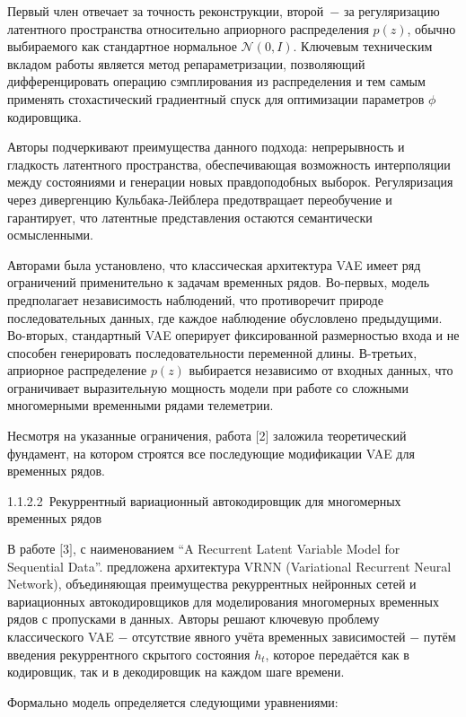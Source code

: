 \documentclass[14pt, a4paper, oneside]{extreport}
\begin{document}
Первый член отвечает за точность реконструкции, второй~$-$ за регуляризацию латентного пространства относительно априорного распределения $p(z)$, обычно выбираемого как стандартное нормальное $\mathcal{N}(0, I)$. Ключевым техническим вкладом работы является метод репараметризации, позволяющий дифференцировать операцию сэмплирования из распределения и тем самым применять стохастический градиентный спуск для оптимизации параметров $\phi$ кодировщика.

Авторы подчеркивают преимущества данного подхода: непрерывность и гладкость латентного пространства, обеспечивающая возможность интерполяции между состояниями и генерации новых правдоподобных выборок. Регуляризация через дивергенцию Кульбака-Лейблера предотвращает переобучение и гарантирует, что латентные представления остаются семантически осмысленными.

Авторами была установлено, что классическая архитектура VAE имеет ряд ограничений применительно к задачам временных рядов. 
Во-первых, модель предполагает независимость наблюдений, что противоречит природе последовательных данных, где каждое наблюдение обусловлено предыдущими. 
Во-вторых, стандартный VAE оперирует фиксированной размерностью входа и не способен генерировать последовательности переменной длины. 
В-третьих, априорное распределение $p(z)$ выбирается независимо от входных данных, что ограничивает выразительную мощность модели при работе со сложными многомерными временными рядами телеметрии. 

Несмотря на указанные ограничения, работа $[$2$]$ заложила теоретический фундамент, на котором строятся все последующие модификации VAE для временных рядов.

\clearpage
1.1.2.2~Рекуррентный вариационный автокодировщик для многомерных временных рядов
\vspace{1em}

В работе $[$3$]$, с наименованием “A Recurrent Latent Variable Model for Sequential Data”.  предложена архитектура VRNN (Variational Recurrent Neural Network), объединяющая преимущества рекуррентных нейронных сетей и вариационных автокодировщиков для моделирования многомерных временных рядов с пропусками в данных. Авторы решают ключевую проблему классического VAE $-$ отсутствие явного учёта временных зависимостей $-$ путём введения рекуррентного скрытого состояния $h_t$, которое передаётся как в кодировщик, так и в декодировщик на каждом шаге времени.

Формально модель определяется следующими уравнениями:
\end{document}
